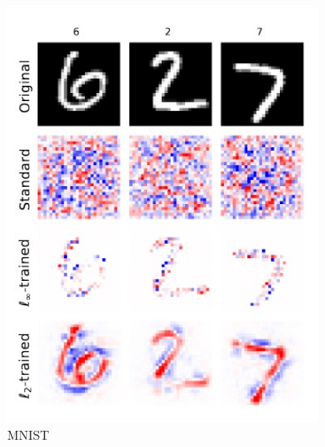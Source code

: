 \begin{figure}[H]
    \centering
    \begin{subfigure}[b]{0.28\textwidth}
        \centering
        \includegraphics[width=\textwidth]{img/introduction/adversarial_loss_1.jpg}
        \caption{MNIST}
    \end{subfigure}
    \hspace{1cm}
    \begin{subfigure}[b]{0.28\textwidth}
        \centering

\end{subfigure}
\end{figure}
